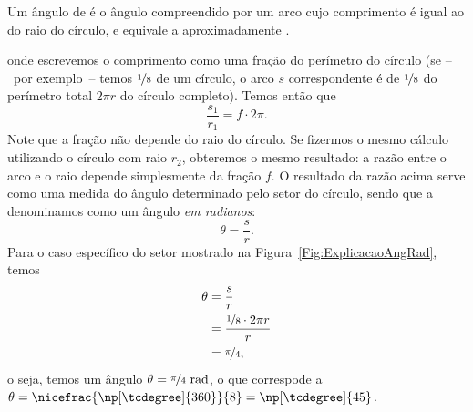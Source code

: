 \begin{marginfigure}[2cm]
\centering
{}
\caption{Um ângulo de  é o ângulo compreendido por um arco cujo comprimento é igual ao do raio do círculo, e equivale a aproximadamente .}
\end{marginfigure}

\noindent{}onde escrevemos o comprimento como uma fração do perímetro do círculo (se --~por exemplo~-- temos $\nicefrac{1}{8}$ de um círculo, o arco $s$ correspondente é de $\nicefrac{1}{8}$ do perímetro total $2\pi r$ do círculo completo). Temos então que 
\begin{equation}
    \frac{s_1}{r_1} = f\cdot 2\pi.
\end{equation}
%
Note que a fração não depende do raio do círculo. Se fizermos o mesmo cálculo utilizando o círculo com raio $r_2$, obteremos o mesmo resultado: a razão entre o arco e o raio depende simplesmente da fração $f$. O resultado da razão acima serve como uma medida do ângulo determinado pelo setor do círculo, sendo que a denominamos como um ângulo \emph{em radianos}:
\begin{equation}
    \theta = \frac{s}{r}.
\end{equation}
%
Para o caso específico do setor mostrado na Figura~\ref{Fig:ExplicacaoAngRad}, temos
\begin{align}
    \theta &= \frac{s}{r} \\
    &= \frac{\nicefrac{1}{8} \cdot 2\pi r}{r} \\
    &= \nicefrac{\pi}{4},
\end{align}
%
o seja, temos um ângulo $\theta = \nicefrac{\pi}{4}~\rm{rad}$, o que correspode a $\theta = \nicefrac{\np[\tcdegree]{360}}{8} = \np[\tcdegree]{45}$.

